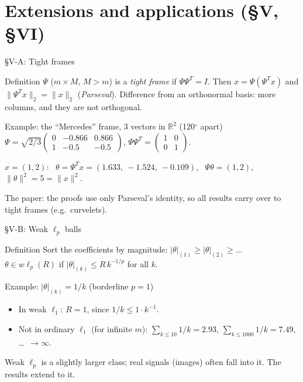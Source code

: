\documentclass[aspectratio=169,11pt]{beamer}
\newcommand{\en}[1]{\textit{#1}}          %
\newcommand{\norm}[1]{\lVert #1\rVert}
\begin{document}
\section{Extensions and applications (\S V, \S VI)}

\begin{frame}{\S V-A: Tight frames}
  \begin{block}{Definition}
    $\Psi$ ($m\times M$, $M>m$) is a \en{tight frame} if $\Psi\Psi^T=I$. Then $x=\Psi(\Psi^Tx)$ and $\norm{\Psi^Tx}_2=\norm{x}_2$ (\en{Parseval}).
    Difference from an orthonormal basis: more columns, and they are not orthogonal.
  \end{block}
  \begin{exampleblock}{Example: the ``Mercedes'' frame, 3 vectors in $\mathbb{R}^2$ (120$^\circ$ apart)}
    $\Psi=\sqrt{2/3}\begin{pmatrix}0&-0.866&0.866\\1&-0.5&-0.5\end{pmatrix}$, \quad $\Psi\Psi^T=\begin{pmatrix}1&0\\0&1\end{pmatrix}$.
    \medskip

    $x=(1,2)$: \ $\theta=\Psi^Tx=(1.633,\ -1.524,\ -0.109)$, \ $\Psi\theta=(1,2)$, \ $\norm{\theta}^2=5=\norm{x}^2$.
  \end{exampleblock}
  {\small The paper: the proofs use only Parseval's identity, so all results carry over to tight frames (e.g.\ curvelets).}
\end{frame}

\begin{frame}{\S V-B: Weak $\ell_p$ balls}
  \begin{block}{Definition}
    Sort the coefficients by magnitude: $|\theta|_{(1)}\ge|\theta|_{(2)}\ge\dots$ \\
    $\theta\in w\ell_p(R)$ if $|\theta|_{(k)}\le R\,k^{-1/p}$ for all $k$.
  \end{block}
  \begin{exampleblock}{Example: $|\theta|_{(k)}=1/k$ (borderline $p=1$)}
    \begin{itemize}
      \item In weak $\ell_1$: $R=1$, since $1/k\le1\cdot k^{-1}$.
      \item Not in ordinary $\ell_1$ (for infinite $m$): $\sum_{k\le10}1/k=2.93$, $\sum_{k\le1000}1/k=7.49$, \dots\ $\to\infty$.
    \end{itemize}
  \end{exampleblock}
  {\small Weak $\ell_p$ is a slightly larger class; real signals (images) often fall into it. The results extend to it.}
\end{frame}
\end{document}
